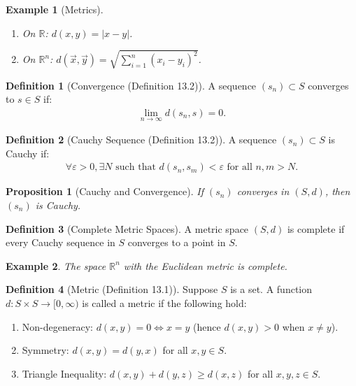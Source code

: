 \documentclass[7pt]{article}
\theoremstyle{definition}
\newtheorem{definition}{Definition}
\theoremstyle{plain}
\newtheorem{proposition}{Proposition}
\newtheorem{example}{Example}
\begin{document}
\begin{example}[Metrics]

\begin{enumerate}
    \item On $ \mathbb{R} $: $ d(x, y) = |x - y| $.
    \item On $ \mathbb{R}^n $: $ d(\vec{x}, \vec{y}) = \sqrt{\sum_{i=1}^n (x_i - y_i)^2} $.
\end{enumerate}
\end{example}

\begin{definition}[Convergence (Definition 13.2)]
A sequence $ (s_n) \subset S $ converges to $ s \in S $ if:
\begin{align}
\lim_{n \to \infty} d(s_n, s) = 0.
\end{align}
\end{definition}

\begin{definition}[Cauchy Sequence (Definition 13.2)]
A sequence $ (s_n) \subset S $ is Cauchy if:
\begin{align}
\forall \varepsilon > 0, \exists N \text{ such that } d(s_n, s_m) < \varepsilon \text{ for all } n, m > N.
\end{align}
\end{definition}

\begin{proposition}[Cauchy and Convergence]
If $ (s_n) $ converges in $ (S, d) $, then $ (s_n) $ is Cauchy.
\end{proposition}

\begin{definition}[Complete Metric Spaces]
A metric space $ (S, d) $ is complete if every Cauchy sequence in $ S $ converges to a point in $ S $.
\end{definition}

\begin{example}
The space $ \mathbb{R}^n $ with the Euclidean metric is complete.
\end{example}

\begin{definition}[Metric (Definition 13.1)]
Suppose $ S $ is a set. A function $ d : S \times S \to [0, \infty) $ is called a metric if the following hold:
\begin{enumerate}[label=(D\arabic*)]
    \item {Non-degeneracy:} $ d(x, y) = 0 \iff x = y $ (hence $ d(x, y) > 0 $ when $ x \neq y $).
    \item {Symmetry:} $ d(x, y) = d(y, x) $ for all $ x, y \in S $.
    \item {Triangle Inequality:} $ d(x, y) + d(y, z) \geq d(x, z) $ for all $ x, y, z \in S $.
\end{enumerate}
\end{definition}
\end{document}
